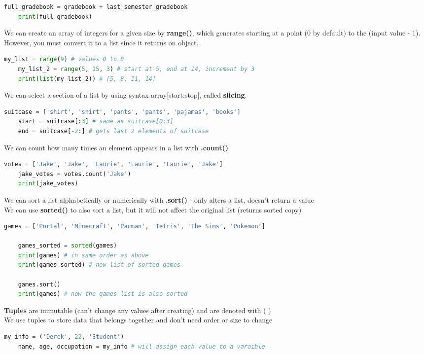 \documentclass[11pt, a4paper]{article}
\begin{document}
\begin{spacing}{1.1}
\begin{lstlisting}[language=Python]
	full_gradebook = gradebook + last_semester_gradebook
	print(full_gradebook) \end{lstlisting}\vspace*{1mm}
	We can create an array of integers for a given size by \textbf{range()}, which generates starting at a point (0 by default) to the (input value - 1). However, you must convert it to a list since it returns on object.
	\begin{lstlisting}[language=Python]
	my_list = range(9) # values 0 to 8
	my_list_2 = range(5, 15, 3) # start at 5, end at 14, increment by 3
	print(list(my_list_2)) # [5, 8, 11, 14] \end{lstlisting}\vspace*{1mm}
	We can select a section of a list by using syntax array[start:stop], called \textbf{slicing}. 
	\begin{lstlisting}[language=Python]
	suitcase = ['shirt', 'shirt', 'pants', 'pants', 'pajamas', 'books']
	start = suitcase[:3] # same as suitcase[0:3]
	end = suitcase[-2:] # gets last 2 elements of suitcase \end{lstlisting}\vspace*{1mm}
	We can count how many times an element appears in a list with \textbf{.count()}
	\begin{lstlisting}[language=Python]
	votes = ['Jake', 'Jake', 'Laurie', 'Laurie', 'Laurie', 'Jake']
	jake_votes = votes.count('Jake')
	print(jake_votes) \end{lstlisting}\vspace*{1mm}
	We can sort a list alphabetically or numerically with \textbf{.sort()} - only alters a list, doesn't return a value \\
	We can use \textbf{sorted()} to also sort a list, but it will not affect the original list (returns sorted copy)
	\begin{lstlisting}[language=Python]
	games = ['Portal', 'Minecraft', 'Pacman', 'Tetris', 'The Sims', 'Pokemon']
	
	games_sorted = sorted(games)
	print(games) # in same order as above
	print(games_sorted) # new list of sorted games
	
	games.sort()
	print(games) # now the games list is also sorted \end{lstlisting}\vspace*{1mm}
	\textbf{Tuples} are immutable (can't change any values after creating) and are denoted with ( ) \\
	We use tuples to store data that belongs together and don't need order or size to change
	\begin{lstlisting}[language=Python]
	my_info = ('Derek', 22, 'Student')
	name, age, occupation = my_info # will assign each value to a varaible
	

\end{lstlisting}
\end{spacing}
\end{document}
